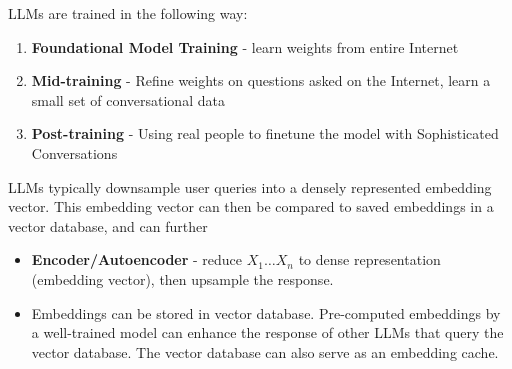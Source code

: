 \documentclass{article}
\begin{document}
LLMs are trained in the following way:
\begin{enumerate}
    \item \textbf{Foundational Model Training} - learn weights from entire Internet
    \item \textbf{Mid-training} - Refine weights on questions asked on the Internet, learn a small set of conversational data
    \item \textbf{Post-training} - Using real people to finetune the model with Sophisticated Conversations
\end{enumerate}

LLMs typically downsample user queries into a densely represented embedding vector. This embedding vector can then be compared to saved embeddings in a vector database, and can further
\begin{itemize}
    \item \textbf{Encoder/Autoencoder} - reduce $X_1 \ldots X_n$ to dense representation (embedding vector), then upsample the response.
    \item Embeddings can be stored in vector database. Pre-computed embeddings by a well-trained model can enhance the response of other LLMs that query the vector database. The vector
    database can also serve as an embedding cache.
\end{itemize}
\end{document}
